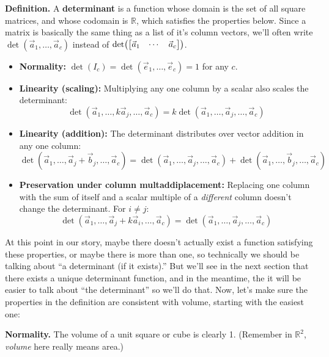 \documentclass[11pt, letterpaper]{report}
\newenvironment{notes}{}{}
\let\originalleft\left
\let\originalright\right
\renewcommand{\left}{\mathopen{}\mathclose\bgroup\originalleft}
\renewcommand{\right}{\aftergroup\egroup\originalright}
\newenvironment{definition}{\begin{bbox}\par\noindent\textbf{Definition. }}
  {\end{bbox}}
\newlength\oldfboxsep%
\newlength\myminiwidth%
\newenvironment{bbox}{%
  \setlength\oldfboxsep\fboxsep
  \setlength{\fboxsep}{.1in}%
  \setlength\myminiwidth\linewidth%
  \addtolength\myminiwidth{-0.2in}%
  \vspace{0.1in}%
  \begin{lrbox}{\bboxbox}\begin{minipage}{\myminiwidth}%
    }{%
    \end{minipage}\end{lrbox}%
  \noindent\fbox{\usebox{\bboxbox}}\vspace{0.1in}\setlength\fboxsep\oldfboxsep%
}
\newcommand{\R}{\mathbb{R}}
\begin{document}
\begin{notes}
\newpage
\end{notes}

\begin{definition} 
A \textbf{determinant} is a function whose domain is the set of all square matrices, and whose codomain is $\R$, which satisfies the properties below. Since a matrix is basically the same thing as a list of it's column vectors, we'll often write $\det(\vec{a}_1, \ldots, \vec{a}_c)$ instead of $\det\left( \begin{bmatrix}
\vec{a}_1 & \cdots & \vec{a}_c
\end{bmatrix} \right)$.
\begin{itemize}
\item \textbf{Normality:} $\det(I_c) = \det(\vec{e}_1, \ldots, \vec{e}_c)= 1$ for any $c$.
\item \textbf{Linearity (scaling):} Multiplying any one column by a scalar also scales the determinant: \[\det (\vec{a}_1, \ldots, k\vec{a}_j, \ldots, \vec{a}_c) = k \det (\vec{a}_1, \ldots, \vec{a}_j, \ldots, \vec{a}_c)\]
\item \textbf{Linearity (addition):} The determinant distributes over vector addition in any one column:
\[\det(\vec{a}_1, \ldots, \vec{a}_j+\vec{b}_j,\ldots, \vec{a}_c) = \det(\vec{a}_1, \ldots, \vec{a}_j,\ldots, \vec{a}_c) + \det(\vec{a}_1, \ldots, \vec{b}_j,\ldots, \vec{a}_c)\]
\item \textbf{Preservation under column multaddiplacement:} Replacing one column with the sum of itself and a scalar multiple of a \emph{different} column doesn't change the determinant. For $i \ne j$:
\[\det(\vec{a}_1,\ldots,\vec{a}_j+k\vec{a}_i, \ldots, \vec{a}_c) = \det(\vec{a}_1,\ldots,\vec{a}_j, \ldots, \vec{a}_c)\]
\end{itemize}
\end{definition}

At this point in our story, maybe there doesn't actually exist a function satisfying these properties, or maybe there is more than one, so technically we should be talking about ``a determinant (if it exists).'' But we'll see in the next section that there exists a unique determinant function, and in the meantime, the it will be easier to talk about ``the determinant'' so we'll do that.
Now, let's make sure the properties in the definition are consistent with volume, starting with the easiest one:

\textbf{Normality.} The volume of a unit square or cube is clearly 1. (Remember in $\R^2$, \emph{volume} here really means area.)
\end{document}
